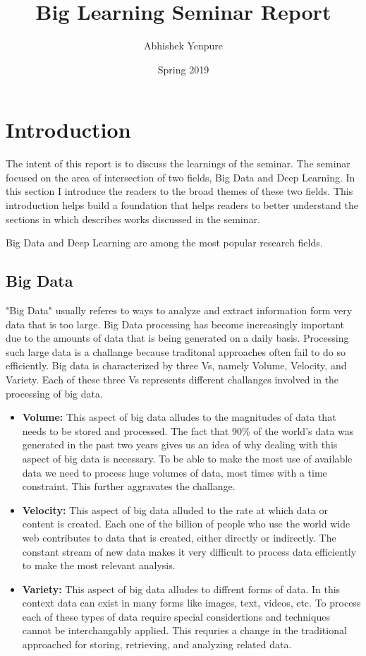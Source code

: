 \documentclass[12pt]{extarticle}
\title{Big Learning Seminar Report}
\author{Abhishek Yenpure}
\date{Spring 2019}
\begin{document}
\maketitle

\section{Introduction}
%
The intent of this report is to discuss the learnings of the seminar.
%
The seminar focused on the area of intersection of two fields, Big Data and Deep Learning.
%
In this section I introduce the readers to the broad themes of these two fields.
%
This introduction helps build a foundation that helps readers to better understand the
sections in which describes works discussed in the seminar. 

Big Data and Deep Learning are among the most popular research fields.
%

%
\subsection{Big Data}
"Big Data" usually referes to ways to analyze and extract information form very
data that is too large.
%
Big Data processing has become increasingly important due to the amounts of data
that is being generated on a daily basis.
%
Processing such large data is a challange because traditonal approaches often fail
to do so efficiently.
%
Big data is characterized by three Vs, namely Volume, Velocity, and Variety.
%
Each of these three Vs represents different challanges involved in the processing
of big data.
%
\begin{itemize}
\item \textbf{Volume:}
%
This aspect of big data alludes to the magnitudes of data that needs to be stored
and processed.
%
The fact that 90\% of the world's data was generated in the past two years gives
us an idea of why dealing with this aspect of big data is necessary.
%
To be able to make the most use of available data we need to process huge volumes
of data, most times with a time constraint.
%
This further aggravates the challange.

\item \textbf{Velocity:}
%
This aspect of big data alluded to the rate at which data or content is created.
%
Each one of the billion of people who use the world wide web contributes to data
that is created, either directly or indirectly.
%
The constant stream of new data makes it very difficult to process data efficiently
to make the most relevant analysis.

\item \textbf{Variety:}
%
This aspect of big data alludes to diffrent forms of data.
%
In this context data can exist in many forms like images, text, videos, etc.
%
To process each of these types of data require special considertions and techniques
cannot be interchangably applied.
%
This requries a change in the traditional approached for storing, retrieving, and 
analyzing related data.

\end{itemize}
%
\end{document}
